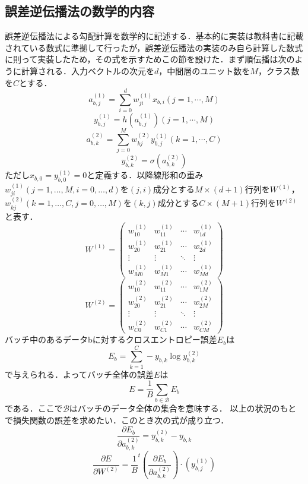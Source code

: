\documentclass[uplatex]{jsarticle}
\begin{document}
    \subsection{誤差逆伝播法の数学的内容}
    誤差逆伝播法による勾配計算を数学的に記述する．基本的に実装は教科書に記載されている数式に準拠して行ったが，誤差逆伝播法の実装のみ自ら計算した数式に則って実装したため，その式を示すためこの節を設けた．まず順伝播は次のように計算される．入力ベクトルの次元を$d$，中間層のユニット数を$M$，クラス数を$C$とする．
    $$ a_{b,j}^{(1)} = \sum_{i = 0}^d w_{ji}^{(1)} x_{b,i} (j = 1, \cdots, M)$$
    $$ y_{b,j}^{(1)} = h(a_{b,j}^{(1)}) (j = 1, \cdots, M)$$
    $$ a_{b,k}^{(2)} = \sum_{j = 0}^M w_{kj}^{(2)} y_{b,j}^{(1)} (k = 1, \cdots, C)$$
    $$ y_{b,k}^{(2)} = \sigma(a_{b,k}^{(2)}) $$
    ただし$x_{b,0} = y_{b,0}^{(1)} = 0$と定義する．以降線形和の重み$w_{ji}^{(1)}(j = 1, \ldots ,M, i = 0, \ldots ,d)$を$(j,i)$成分とする$M \times (d + 1)$行列を$W^{(1)}$，$w_{kj}^{(2)}(k = 1, \ldots ,C, j = 0, \ldots ,M)$を$(k,j)$成分とする$C \times (M + 1)$行列を$W^{(2)}$と表す．
    $$ W^{(1)} = 
    \begin{pmatrix}
        w_{10}^{(1)} & w_{11}^{(1)} & \cdots & w_{1d}^{(1)} \\
        w_{20}^{(1)} & w_{21}^{(1)} & \cdots & w_{2d}^{(1)} \\
        \vdots & \vdots & \ddots & \vdots \\
        w_{M0}^{(1)} & w_{M1}^{(1)} & \cdots & w_{Md}^{(1)} 
    \end{pmatrix}
    $$
    $$ W^{(2)} = 
    \begin{pmatrix}
        w_{10}^{(2)} & w_{11}^{(2)} & \cdots & w_{1M}^{(2)} \\
        w_{20}^{(2)} & w_{21}^{(2)} & \cdots & w_{2M}^{(2)} \\
        \vdots & \vdots & \ddots & \vdots \\
        w_{C0}^{(2)} & w_{C1}^{(2)} & \cdots & w_{CM}^{(2)} 
    \end{pmatrix}
    $$
    バッチ中のあるデータbに対するクロスエントロピー誤差$E_{b}$は
    $$E_{b} = \sum_{k=1}^C - y_{b,k} \log y_{b,k}^{(2)}$$
    で与えられる．よってバッチ全体の誤差$E$は
    $$E = \frac{1}{B} \sum_{b \in \mathscr{B}} E_b$$
    である．ここで$\mathscr{B}$はバッチのデータ全体の集合を意味する．
    以上の状況のもとで損失関数の誤差を求めたい．このとき次の式が成り立つ．
    $$\frac{\partial E_b}{\partial a_{b,k}^{(2)}} = y_{b,k}^{(2)} - y_{b,k}$$
    $$\frac{\partial E}{\partial W^{(2)}} = \frac{1}{B} ^t\!{\left( \frac{\partial E_b}{\partial a_{b,k}^{(2)}} \right)} \cdot \left( y_{b,j}^{(1)} \right)$$
\end{document}
